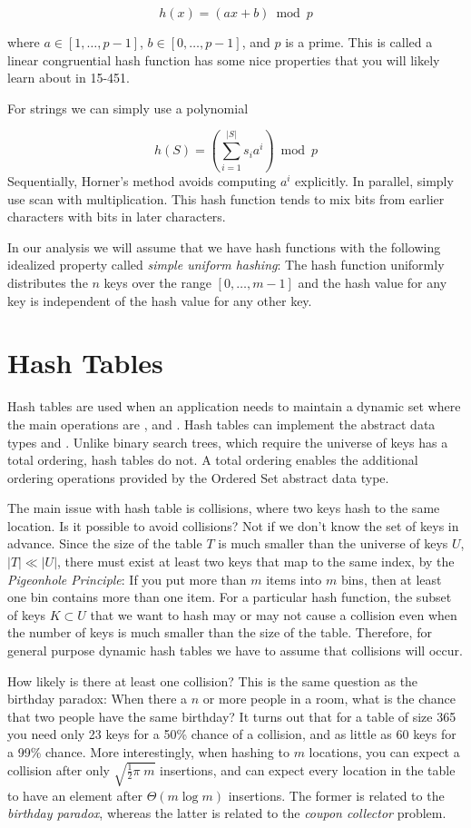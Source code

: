 \[h(x) = (a x + b) \bmod p\]

where $a \in [1, \ldots, p-1]$, $b \in [0, \ldots, p-1]$, and $p$ is a
prime.  This is called a linear congruential hash function has some
nice properties that you will likely learn about in 15-451.

For strings we can simply use a polynomial

\[h(S) = \left(\sum_{i=1}^{|S|}  s_i a^i \right) \bmod p \]
Sequentially, Horner's method avoids computing $a^i$ explicitly.  In
parallel, simply use scan with multiplication. This hash function
tends to mix bits from earlier characters with bits in later
characters.

In our analysis we will assume that we have hash functions with the
following idealized property called \emph{simple uniform hashing}: The
hash function uniformly distributes the $n$ keys over the range $[0,
  \ldots, m-1]$ and the hash value for any key is independent of the
hash value for any other key.

\section{Hash Tables}

Hash tables are used when an application needs to maintain a
dynamic set where the main operations are , 
and . Hash tables can implement the abstract data types
 and .  Unlike binary search trees, which
require the universe of keys has a total ordering, hash
tables do not. A total ordering enables the additional ordering operations
provided by the Ordered Set abstract data type.

The main issue with hash table is collisions, where two keys hash to
the same location.  Is it possible to avoid collisions? Not if we
don't know the set of keys in advance.  Since the size of the table
$T$ is much smaller than the universe of keys $U$, $|T| \ll |U|$, there
must exist at least two keys that map to the same index, by the
\emph{Pigeonhole Principle}: If you put more than $m$ items into $m$
bins, then at least one bin contains more than one item.  For a
particular hash function, the subset of keys $K \subset U$ that we
want to hash may or may not cause a collision even when the number of
keys is much smaller than the size of the table.  Therefore, for
general purpose dynamic hash tables we have to assume that collisions
will occur.

How likely is there at least one collision? This is the same question
as the birthday paradox: When there a $n$ or more people in a room,
what is the chance that two people have the same birthday?  It turns
out that for a table of size 365 you need only 23 keys for a 50\%
chance of a collision, and as little as 60 keys for a 99\%
chance. More interestingly, when hashing to $m$ locations, you can
expect a collision after only $\sqrt{\frac12 \pi\;m}$ insertions, and
can expect every location in the table to have an element after
$\Theta(m \log m)$ insertions.  The former is related to the
\emph{birthday paradox}, whereas the latter is related to the
\emph{coupon collector} problem.


